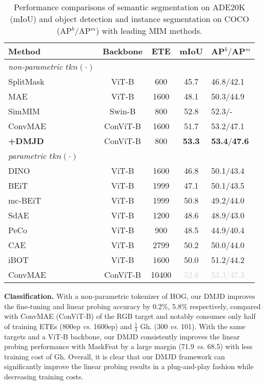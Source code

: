 \documentclass[lettersize,journal]{IEEEtran}
\begin{document}
\begin{table}[!t]
  \centering
  \caption{Performance comparisons of semantic segmentation on ADE20K (mIoU) and object detection and instance segmentation on COCO (AP$^b/$AP$^m$) with leading MIM methods.}
  \label{tab:det}
      \begin{tabular}{lcccl}
        \toprule
        Method        & Backbone & ETE  & mIoU & AP$^b/$AP$^m$ \\
        \midrule
        \emph{non-parametric $tkn(\cdot)$}       \\
        SplitMask~\cite{2021arXiv211210740E} & ViT-B & 600 & 45.7 & 46.8$/$42.1 \\
        MAE~\cite{2021arXiv211106377H} & ViT-B & 1600 & 48.1 & 50.3$/$44.9 \\
        SimMIM~\cite{2021arXiv211109886X} & Swin-B & 800 & 52.8 & 52.3$/$- \\
        ConvMAE~\cite{2022arXiv220503892G} & ConViT-B & 1600 & 51.7 & 53.2$/$47.1 \\
        \rowcolor{mygray} \quad \textbf{+DMJD}  & ConViT-B & 800 & \textbf{53.3} & \textbf{53.4$/$47.6} \\
        \hline
        \emph{parametric $tkn(\cdot)$}      \\
        DINO~\cite{caron2021emerging} & ViT-B & 1600 & 46.8 & 50.1$/$43.4 \\
        BEiT~\cite{2021arXiv210608254B} & ViT-B & 1999 & 47.1 & 50.1$/$43.5 \\
        mc-BEiT~\cite{Li2022mcBEiTMD} & ViT-B & 1999 & 50.8 & 49.2$/$44.0 \\
        SdAE~\cite{2022arXiv220800449C} & ViT-B & 1200 & 48.6 & 48.9$/$43.0 \\
        PeCo~\cite{2021arXiv211112710D} & ViT-B & 900 & 48.5 & 44.9$/$40.4 \\
        CAE~\cite{2022arXiv220203026C} & ViT-B & 2799 & 50.2 & 50.0$/$44.0 \\
        iBOT~\cite{2021arXiv211107832Z} & ViT-B & 1600 & 50.0 & 51.2$/$44.2 \\
        ConvMAE~\cite{2022arXiv220503892G} & ConViT-B & 10400 & \textcolor{lightgray}{52.8} & \textcolor{lightgray}{53.3$/$47.3} \\
        \bottomrule
      \end{tabular}
\end{table}

\textbf{Classification.}
With a non-parametric tokenizer of HOG, our DMJD improves the fine-tuning and linear probing accuracy by 0.2$\%$, 5.8$\%$ respectively, compared with ConvMAE (ConViT-B) of the RGB target and notably consumes only half of training ETEs (800ep \textit{vs.} 1600ep) and $\frac{1}{3}$ Gh. (300 \textit{vs.} 101). 
With the same targets and a ViT-B backbone, our DMJD consistently improves the linear probing performance with MaskFeat by a large margin (71.9 \textit{vs.} 68.5) with less training cost of Gh.
Overall, it is clear that our DMJD framework can significantly improve the linear probing results in a plug-and-play fashion while decreasing training costs. %
\end{document}
